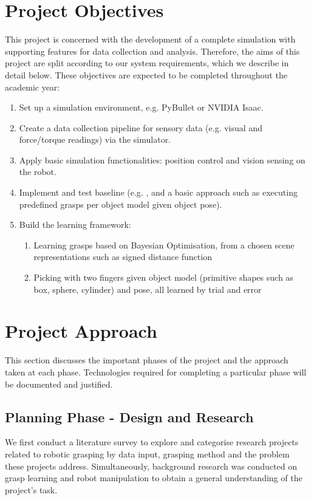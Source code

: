 \documentclass[11pt, a4paper]{report}
\begin{document}
\section{Project Objectives}\label{sec:1.3}
This project is concerned with the development of a complete simulation with supporting features for data collection and analysis. Therefore, the aims of this project are split according to our system requirements, which we describe in detail below. These objectives are expected to be completed throughout the academic year:
\begin{enumerate}
    \item Set up a simulation environment, e.g. PyBullet \cite{coumans2021} or NVIDIA Isaac. 
    \item Create a data collection pipeline for sensory data (e.g. visual and force/torque readings) via the simulator.
    \item Apply basic simulation functionalities: position control and vision sensing on the robot.
    \item Implement and test baseline (e.g. \cite{breyer2020volumetric}, and a basic approach such as executing predefined grasps per object model given object pose).
    \item Build the learning framework:
    \begin{enumerate}
        \item Learning grasps based on Bayesian Optimisation, from a chosen scene representations such as signed distance function 
        \item Picking with two fingers given object model (primitive shapes such as box, sphere, cylinder) and pose, all learned by trial and error
    \end{enumerate}
\end{enumerate}


\section{Project Approach}\label{sec:1.4}
This section discusses the important phases of the project and the approach taken at each phase. Technologies required for completing a particular phase will be documented and justified.


\subsection{Planning Phase - Design and Research}\label{sec:1.4.1}
We first conduct a literature survey to explore and categorise research projects related to robotic grasping by data input, grasping method and the problem these projects address. Simultaneously, background research was conducted on grasp learning \cite{platt2022grasp} and robot manipulation to obtain a general understanding of the project's task.
\end{document}
